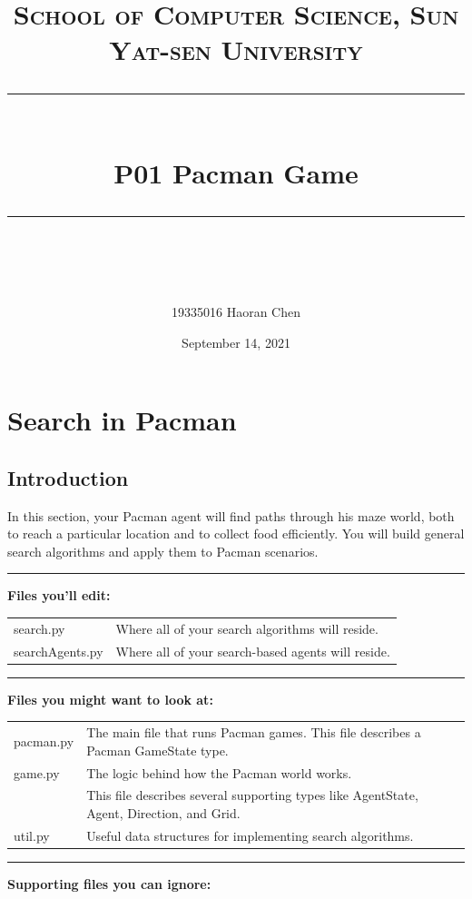 \documentclass[a4paper, 11pt]{article}
\title{	
\normalfont \normalsize
\textsc{School of Computer Science, Sun Yat-sen University} \\ [25pt] %
\rule{\textwidth}{0.5pt} \\[0.4cm] %
\huge  P01 Pacman Game \\ %
\rule{\textwidth}{2pt} \\[0.5cm] %
\author{19335016 Haoran Chen}
\date{\normalsize September 14, 2021}
}
\begin{document}
\maketitle
\tableofcontents
\newpage
\section{Search in Pacman}
\subsection{Introduction}
In this section, your Pacman agent will find paths through his maze world, both to reach a particular location and to collect food efficiently. You will build general search algorithms and apply them to Pacman scenarios.

\rule{\textwidth}{0.5pt}

\textbf{Files you'll edit:}

\begin{tabular}{ll}
  \textsf{search.py} &  Where all of your search algorithms will reside.\\
  \textsf{searchAgents.py} & Where all of your search-based agents will reside.
\end{tabular}

\rule{\textwidth}{0.5pt}

\textbf{Files you might want to look at:}

\begin{tabular}{ll}
  \textsf{pacman.py} & The main file that runs Pacman games. This file describes a Pacman GameState type.\\
  \textsf{game.py} &	The logic behind how the Pacman world works.\\
  & This file describes several supporting types like AgentState, Agent, Direction, and Grid.\\
  \textsf{util.py} &	Useful data structures for implementing search algorithms.
\end{tabular}

\rule{\textwidth}{0.5pt}

\textbf{Supporting files you can ignore:}
\end{document}
